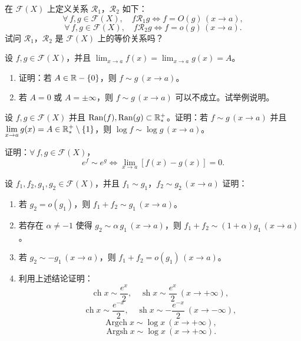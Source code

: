 \begin{exercise}
	\item 在 \(\mathscr{F}(X)\) 上定义关系 \(\mathscr{R}_1\)，\(\mathscr{R}_2\) 如下：
	\[\forall\,f,g\in\mathscr{F}(X),\quad f\mathscr{R}_1g\Longleftrightarrow f=O(g)\,(x\to a),\]
	\[\forall\,f,g\in\mathscr{F}(X),\quad f\mathscr{R}_2g\Longleftrightarrow f=o(g)\,(x\to a).\]
	试问 \(\mathscr{R}_1\)，\(\mathscr{R}_2\) 是 \(\mathscr{F}(X)\) 上的等价关系吗？
\end{exercise}

\begin{exercise}
	\item 设 \(f,g\in\mathscr{F}(X)\)，并且 \(\displaystyle\lim_{x\to a}f(x)=\lim_{x\to a}g(x)=A\)。
	\begin{enumerate}[label=\arabic*)]
		\item 证明：若 \(A\in\mathbb{R}-\{0\}\)，则 \(f\sim g\,(x\to a)\)。
		\item 若 \(A=0\) 或 \(A=\pm\infty\)，则 \(f\sim g\,(x\to a)\) 可以不成立。试举例说明。
	\end{enumerate}
\end{exercise}

\begin{exercise}
	\item 设 \(f,g\in\mathscr{F}(X)\) 并且 \(\operatorname{Ran}(f),\operatorname{Ran}(g)\subset\mathbb{R}_*^+\)。证明：若 \(f\sim g\,(x\to a)\) 并且 \(\displaystyle\lim_{x\to a}g(x)=A\in\mathbb{R}_*^+\setminus\{1\}\)，则 \(\log f\sim\log g\,(x\to a)\)。
\end{exercise}

\begin{exercise}
	\item 证明：\(\forall\,f,g\in\mathscr{F}(X)\)，
	\[e^{f}\sim e^{g}\Longleftrightarrow\lim_{x\to a}[f(x)-g(x)]=0.\]
\end{exercise}

\begin{exercise}
	\item 设 \(f_1,f_2,g_1,g_2\in\mathscr{F}(X)\)，并且 \(f_1\sim g_1\)，\(f_2\sim g_2\,(x\to a)\) 证明：
	\begin{enumerate}[label=\arabic*)]
		\item 若 \(g_2=o(g_1)\)，则 \(f_1+f_2\sim g_1\,(x\to a)\)。
		\item 若存在 \(\alpha\neq-1\) 使得 \(g_2\sim\alpha\,g_1\,(x\to a)\)，则 \(f_1+f_2\sim(1+\alpha)g_1\,(x\to a)\)。
		\item 若 \(g_2\sim-g_1\,(x\to a)\)，则 \(f_1+f_2=o(g_1)\,(x\to a)\)。
		\item 利用上述结论证明：
		\[\operatorname{ch}x\sim\frac{e^x}{2},\quad \operatorname{sh}x\sim\frac{e^x}{2}\ (x\to+\infty),\]
		\[\operatorname{ch}x\sim\frac{e^{-x}}{2},\quad \operatorname{sh}x\sim-\frac{e^{-x}}{2}\ (x\to-\infty),\]
		\[\operatorname{Argch}x\sim\log x\ (x\to+\infty),\]
		\[\operatorname{Argsh}x\sim\log x\ (x\to+\infty).\]
	\end{enumerate}
\end{exercise}

